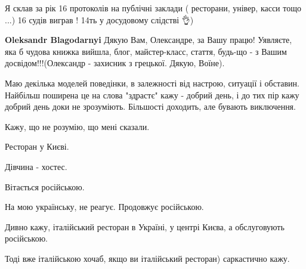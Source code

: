 \begin{itemize}
Я склав за рік 16 протоколів на публічні заклади ( ресторани, універ, касси
тощо ...) 16 судів виграв ! 14ть у досудовому слідстві 👌)

\begin{itemize}
 
\textbf{Oleksandr Blagodarnyi} Дякую Вам, Олександре, за Вашу працю! Уявляєте,
яка б чудова книжка вийшла, блог, майстер-класс, стаття, будь-що - з Вашим
досвідом!!!\Smiley[1.0][yellow] (Олександр - захисник з грецької. Дякую, Воїне).
\end{itemize}

 

Маю декілька моделей поведінки, в залежності від настрою, ситуації і обставин.
Найбільш поширена це на слова "здрастє" кажу - добрий день, і до тих пір кажу
добрий день доки не зрозуміють. Більшості доходить, але бувають виключення.


 
Кажу, що не розумію, що мені сказали.

 

Ресторан у Києві.

Дівчина - хостес.

Вітається російською.

На мою українську, не реагує. Продовжує російською.

Дивно кажу, італійський ресторан в Україні, у центрі Києва, а обслуговують
російською.

Тоді вже італійською хочаб, якщо ви італійський ресторан) саркастично кажу.


\end{itemize}
